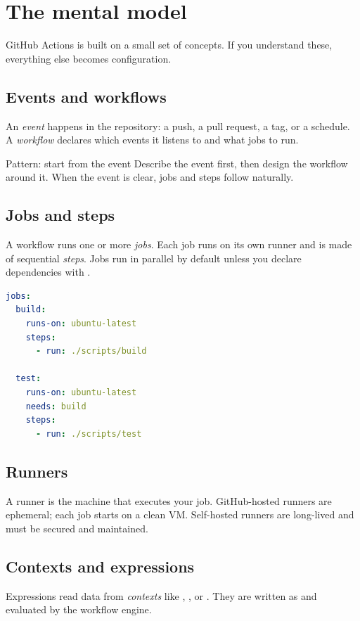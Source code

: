 \chapter{The mental model}

GitHub Actions is built on a small set of concepts.
If you understand these, everything else becomes configuration.

\section{Events and workflows}
An \emph{event} happens in the repository: a push, a pull request, a tag, or a schedule.
A \emph{workflow} declares which events it listens to and what jobs to run.

\begin{patternbox}{Pattern: start from the event}
Describe the event first, then design the workflow around it.
When the event is clear, jobs and steps follow naturally.
\end{patternbox}

\section{Jobs and steps}
A workflow runs one or more \emph{jobs}.
Each job runs on its own runner and is made of sequential \emph{steps}.
Jobs run in parallel by default unless you declare dependencies with .

\begin{lstlisting}[language=YAML]
jobs:
  build:
    runs-on: ubuntu-latest
    steps:
      - run: ./scripts/build

  test:
    runs-on: ubuntu-latest
    needs: build
    steps:
      - run: ./scripts/test
\end{lstlisting}

\section{Runners}
A runner is the machine that executes your job.
GitHub-hosted runners are ephemeral; each job starts on a clean VM.
Self-hosted runners are long-lived and must be secured and maintained.

\section{Contexts and expressions}
Expressions read data from \emph{contexts} like , , or .
They are written as  and evaluated by the workflow engine.

